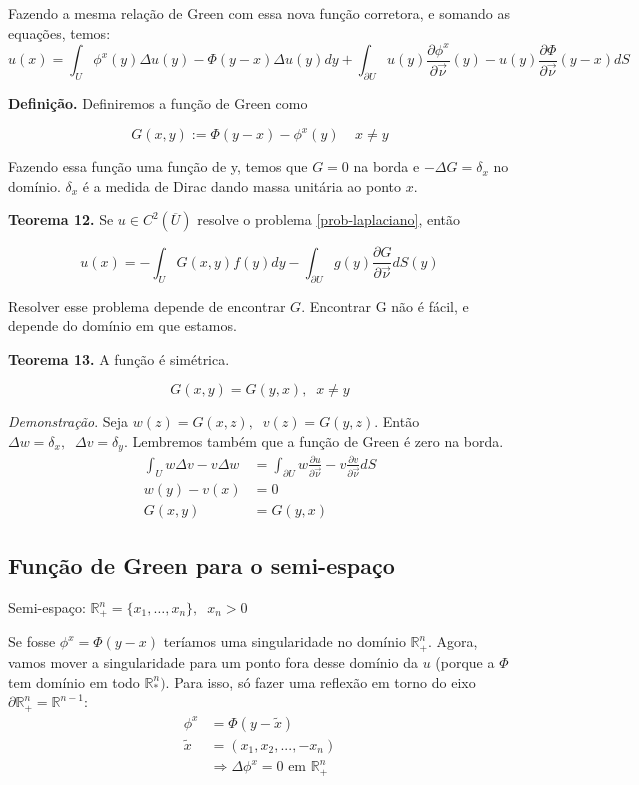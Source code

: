 \documentclass[11pt]{article}
\newcommand{\p}{\partial}
\newcommand{\pde}[2]{\frac{\p #1}{\p #2}}
\newcommand{\dirdev}[1]{\pde{#1}{\vec{\nu}}}
\begin{document}
Fazendo a mesma relação de Green com essa nova função corretora, e somando as equações, temos:
\[u(x)= \int_U \phi^x(y) \Delta u(y) - \Phi (y-x) \Delta u(y) dy + \int_{\p U} u(y) \dirdev{\phi^x}(y) - u(y) \dirdev{\Phi}(y-x) dS\]




\textbf{Definição.} Definiremos a função de Green como

\[G(x,y) := \Phi(y-x) - \phi^x(y) \;\;\;\; x\neq y \]

Fazendo essa função uma função de y, temos que \(G=0\) na borda e \(-\Delta G = \delta_x\) no domínio. \( \delta_x \) é a medida de Dirac dando massa unitária ao ponto \(x\).




\textbf{Teorema 12. }Se \(u \in C^2(\overline{U})\) resolve o problema \eqref{prob-laplaciano}, então

\begin{equation}\label{solgreen}
	u(x) = - \int_U G(x,y) f(y) dy - \int_{\p U} g(y) \dirdev{G} dS(y)
\end{equation} 

Resolver esse problema depende de encontrar \(G\). Encontrar G não é fácil, e depende do domínio em que estamos.



\textbf{Teorema 13. } A função é simétrica.

\[G(x,y) = G(y,x), \;\; x \neq y \]




\textit{Demonstração}. Seja \(w(z) = G(x,z), \;\; v(z)=G(y,z)\). Então \(\Delta w = \delta_x, \;\; \Delta v = \delta_y \). Lembremos também que a função de Green é zero na borda.
\begin{align*}
	\int_U w \Delta v - v \Delta w &= \int_{\p U} w \dirdev{u} - v \dirdev{v} dS \\ w(y) - v(x) &= 0 \\ G(x,y)&=G(y,x)
\end{align*}

\subsection{Função de Green para o semi-espaço}

\newcommand{\seR}{\mathbb{R}^n_+}

Semi-espaço: \(\seR = \{x_1, \ldots, x_n \}, \;\; x_n > 0 \)

Se fosse \( \phi^x = \Phi(y-x) \) teríamos uma singularidade no domínio \(\mathbb{R}^n_+\). Agora, vamos mover a singularidade para um ponto fora desse domínio da \( u \) (porque a \(\Phi\) tem domínio em todo \(\mathbb{R}^n_*)\). Para isso, só fazer uma reflexão em torno do eixo \(\p\seR = \mathbb{R}^{n-1}\):
\begin{align*}
\phi^x &= \Phi( y - \tilde{x} ) \\
\tilde{x} &= (x_1, x_2, ..., -x_n) \\
&\Rightarrow \Delta \phi^x = 0 \text{ em } \mathbb{R}^n_+ 
\end{align*}
\end{document}
